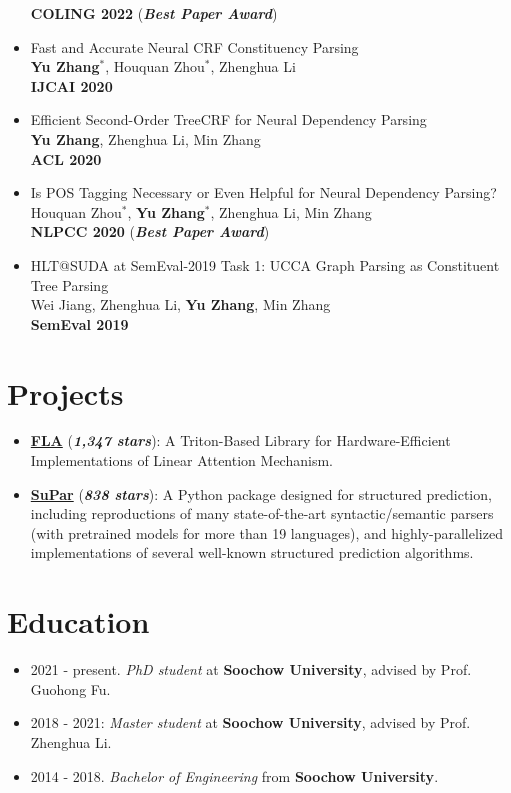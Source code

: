 \documentclass[a4paper,12pt]{article}
\begin{document}
\begin{itemize}[leftmargin=18pt]
            \textbf{COLING 2022} (\textbf{\emph{\textcolor{brickred}{Best Paper Award}}})
      \item Fast and Accurate Neural CRF Constituency Parsing\\
            \textbf{Yu Zhang$^*$}, Houquan Zhou$^*$, Zhenghua Li\\
            \textbf{IJCAI 2020}
      \item Efficient Second-Order TreeCRF for Neural Dependency Parsing\\
            \textbf{Yu Zhang}, Zhenghua Li, Min Zhang\\
            \textbf{ACL 2020}
      \item Is POS Tagging Necessary or Even Helpful for Neural Dependency Parsing?\\
            Houquan Zhou$^*$, \textbf{Yu Zhang$^*$}, Zhenghua Li, Min Zhang\\
            \textbf{NLPCC 2020} (\textbf{\emph{\textcolor{brickred}{Best Paper Award}}})
      \item HLT@SUDA at SemEval-2019 Task 1: UCCA Graph Parsing as Constituent Tree Parsing\\
            Wei Jiang, Zhenghua Li, \textbf{Yu Zhang}, Min Zhang\\
            \textbf{SemEval 2019}
\end{itemize}

\section{Projects}
\begin{itemize}[leftmargin=18pt]
      \item \href{https://github.com/sustcsonglin/flash-linear-attention}{\textbf{FLA}} (\textbf{\emph{\textcolor{brickred}{1,347 stars}}}): A Triton-Based Library for Hardware-Efficient Implementations of Linear Attention Mechanism.
      \item \href{https://github.com/yzhangcs/parser}{\textbf{SuPar}} (\textbf{\emph{\textcolor{brickred}{838 stars}}}): A Python package designed for structured prediction, including reproductions of many state-of-the-art syntactic/semantic parsers (with pretrained models for more than 19 languages), and highly-parallelized implementations of several well-known structured prediction algorithms.
\end{itemize}

\section{Education}
\begin{itemize}[leftmargin=18pt]
      \item 2021 - present. \emph{PhD student} at \textbf{Soochow University}, advised by Prof. Guohong Fu.
      \item 2018 - 2021: \emph{Master student} at \textbf{Soochow University}, advised by Prof. Zhenghua Li.
      \item 2014 - 2018. \emph{Bachelor of Engineering} from \textbf{Soochow University}.
\end{itemize}
\end{document}
